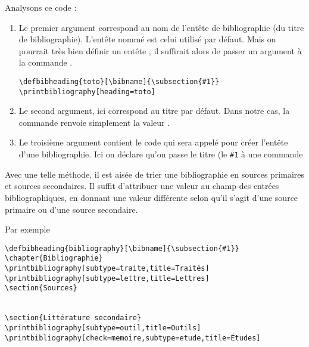 Analysons ce code :
\begin{enumerate}
\item Le premier argument correspond au nom de l'entête de bibliographie (du titre de bibliographie). L'entête nommé  est celui utilisé par défaut. Mais on pourrait très bien définir un entête , il suffirait alors de passer un argument  à la commande .

\begin{verbatim}
\defbibheading{toto}[\bibname]{\subsection{#1}}
\printbibliography[heading=toto]
\end{verbatim}

\item Le second argument, ici  correspond au titre par défaut. Dans notre cas, la commande  renvoie simplement la valeur .
\item Le troisième argument contient le code qui sera appelé pour créer l'entête d'une bibliographie. Ici on déclare qu'on passe le titre (le \verb|#1| à une commande 
\end{enumerate}


Avec une telle méthode, il est aisée de trier une bibliographie en sources primaires et sources secondaires. Il suffit d'attribuer une valeur au champ  des entrées bibliographiques, en donnant une valeur différente selon qu'il s'agit d'une source primaire ou d'une source secondaire.

Par exemple
\begin{verbatim}
\defbibheading{bibliography}[\bibname]{\subsection{#1}}
\chapter{Bibliographie}
\printbibliography[subtype=traite,title=Traités]
\printbibliography[subtype=lettre,title=Lettres]
\section{Sources}


\section{Littérature secondaire}
\printbibliography[subtype=outil,title=Outils]
\printbibliography[check=memoire,subtype=etude,title=Études]

\end{verbatim}

